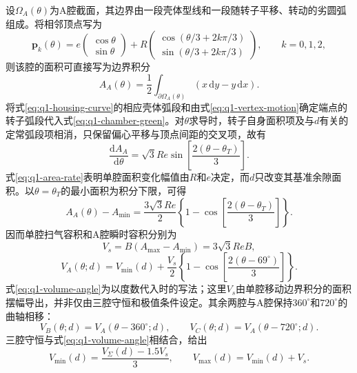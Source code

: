 \documentclass[withoutpreface,bwprint]{cumcmthesis}
\begin{document}
设$\Omega_A(\theta)$为A腔截面，其边界由一段壳体型线和一段随转子平移、转动的劣圆弧组成。将相邻顶点写为
\begin{equation}
 \boldsymbol p_k(\theta)=e\begin{pmatrix}\cos\theta\\ \sin\theta\end{pmatrix}
 +R\begin{pmatrix}\cos(\theta/3+2k\pi/3)\\ \sin(\theta/3+2k\pi/3)\end{pmatrix},
 \qquad k=0,1,2,
 \label{eq:q1-vertex-motion}
\end{equation}
则该腔的面积可直接写为边界积分
\begin{equation}
 A_A(\theta)=\frac12\int_{\partial\Omega_A(\theta)}
 \left(x\,\mathrm{d}y-y\,\mathrm{d}x\right).
 \label{eq:q1-chamber-green}
\end{equation}
将式\eqref{eq:q1-housing-curve}的相应壳体弧段和由式\eqref{eq:q1-vertex-motion}确定端点的转子弧段代入式\eqref{eq:q1-chamber-green}。对$\theta$求导时，转子自身面积项及与$d$有关的定常弧段项相消，只保留偏心平移与顶点间距的交叉项，故有
\begin{equation}
 \frac{\mathrm{d}A_A}{\mathrm{d}\theta}
 =\sqrt{3}Re\sin\left[\frac{2(\theta-\theta_T)}{3}\right].
 \label{eq:q1-area-rate}
\end{equation}
式\eqref{eq:q1-area-rate}表明单腔面积变化幅值由$R$和$e$决定，而$d$只改变其基准余隙面积。以$\theta=\theta_T$的最小面积为积分下限，可得
\begin{equation}
 A_A(\theta)-A_{\min}
 =\frac{3\sqrt{3}Re}{2}
 \left\{1-\cos\left[\frac{2(\theta-\theta_T)}{3}\right]\right\}.
 \label{eq:q1-area-integral}
\end{equation}
因而单腔扫气容积和A腔瞬时容积分别为
\begin{equation}
 V_s=B(A_{\max}-A_{\min})=3\sqrt{3}ReB,
 \label{eq:q1-swept-volume}
\end{equation}
\begin{equation}
 V_A(\theta;d)=V_{\min}(d)+\frac{V_s}{2}
 \left\{1-\cos\left[\frac{2(\theta-69^\circ)}{3}\right]\right\}.
 \label{eq:q1-volume-angle}
\end{equation}
式\eqref{eq:q1-volume-angle}为以度数代入时的写法；这里$V_s$由单腔移动边界积分的面积摆幅导出，并非仅由三腔守恒和极值条件设定。其余两腔与A腔保持$360^\circ$和$720^\circ$的曲轴相移：
\begin{equation}
 V_B(\theta;d)=V_A(\theta-360^\circ;d),\qquad
 V_C(\theta;d)=V_A(\theta-720^\circ;d).
 \label{eq:q1-chamber-phase}
\end{equation}
三腔守恒与式\eqref{eq:q1-volume-angle}相结合，给出
\begin{equation}
 V_{\min}(d)=\frac{V_{\Sigma}(d)-1.5V_s}{3},\qquad
 V_{\max}(d)=V_{\min}(d)+V_s.
 \label{eq:q1-volume-extrema}
\end{equation}
\end{document}
